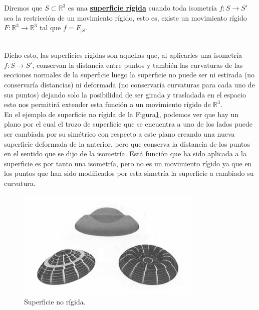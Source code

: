 \begin{definicion}
\begin{definicion}
	Diremos que $S \subset \mathbb{R}^3$ es una \underline{\textbf{superficie rígida}} cuando toda isometría $f : S \to S'$ sea la restricción de un movimiento rígido, esto es, existe un movimiento rígido $F : \mathbb{R}^3 \to \mathbb{R}^3$ tal que $f = F_{|S}$.
\end{definicion}
${ }$\\

Dicho esto, las superficies rígidas son aquellas que, al aplicarles una isometría $f : S \to S'$, conservan la distancia entre puntos y también las curvaturas de las secciones normales de la superficie luego la superficie no puede ser ni estirada (no conservaría distancias) ni deformada (no conservaría curvaturas para cada uno de sus puntos) dejando solo la posibilidad de ser girada y trasladada en el espacio esto nos permitirá extender esta función a un movimiento rígido de $\mathbb{R}^3$.
${ }$\\



En el ejemplo de superficie no rígida de la Figura\ref{fig:etiq_2}, podemos ver que hay un plano por el cual el trozo de superficie que se encuentra a uno de los lados puede ser cambiada por su simétrico con respecto a este plano creando una nueva superficie deformada de la anterior, pero que conserva la distancia de los puntos en el sentido que se dijo de la isometría. Está función que ha sido aplicada a la superficie es por tanto una isometría, pero no es un movimiento rígido ya que en los puntos que han sido modificados por esta simetría la superficie a cambiado su curvatura.
${ }$\\


\begin{figure}[h]
	\begin{center}
		\includegraphics[width=0.8\textwidth]{imagenes/no_rigid}
	\end{center}
	\caption{Superficie no rígida.}
	\label{fig:etiq_2}
\end{figure}



\end{definicion}
